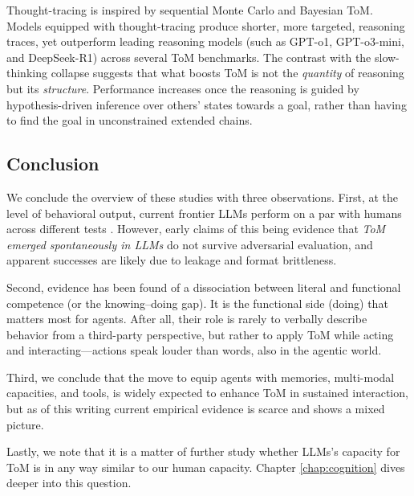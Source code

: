 Thought-tracing is inspired by sequential Monte Carlo and Bayesian ToM. Models equipped with thought-tracing produce shorter, more targeted, reasoning traces, yet outperform leading reasoning models (such as GPT-o1, GPT-o3-mini, and DeepSeek-R1) across several ToM benchmarks. The contrast with the slow-thinking collapse suggests that what boosts ToM is not the \emph{quantity} of reasoning but its \emph{structure}. Performance increases once the reasoning is guided by hypothesis-driven inference over others' states towards a goal, rather than having to find the goal in unconstrained extended chains.

\subsection{Conclusion}
We conclude the overview of these studies with three observations. First, at the level of behavioral output, current frontier LLMs perform on a par with humans across different tests \citep{van2023theory, strachan2024gpt4oreadsmindeyes, jones2024comparing}. However,  early claims of this being evidence that {\em ToM emerged spontaneously in LLMs} do not survive adversarial evaluation, and apparent successes are likely due to leakage and format brittleness. 

Second, evidence has been found of a dissociation between literal and functional competence (or the knowing--doing gap). It is the functional side (doing) that matters most for agents. After all, their role is rarely to verbally describe behavior from a third-party perspective, but rather to apply ToM while acting and interacting---actions speak louder than words, also in the agentic world.

Third, we conclude that the move to equip agents  with memories, multi-modal capacities, and tools, is widely expected to enhance ToM in sustained interaction, but as of this writing current empirical evidence is scarce and shows a mixed picture. 

Lastly, we note that it is a matter of further study whether LLMs's capacity for ToM is in any way similar to our human capacity. Chapter \ref{chap:cognition} dives deeper into this question.


